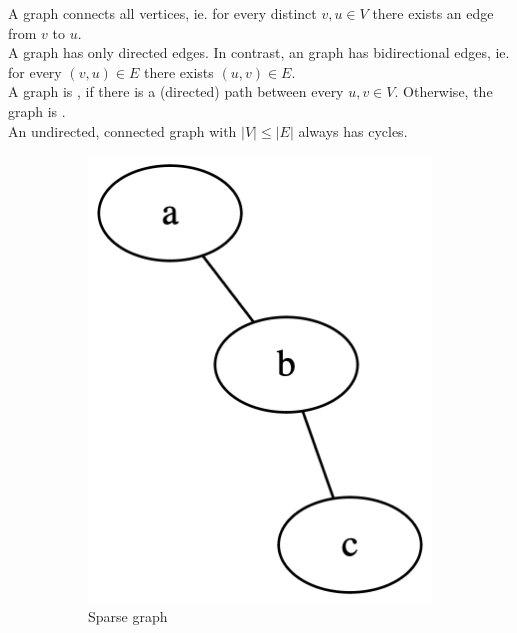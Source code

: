 \documentclass[a3paper, landscape, 11pt]{article} %
\begin{document}
\begin{multicols*}{4}
{A  graph connects all vertices, ie. for every distinct $v,u \in V$ there exists an edge from $v$ to $u$.\\

A  graph has only directed edges. In contrast, an  graph has bidirectional edges, ie. for every $(v,u)\in E$ there exists $(u,v)\in E$.\\

A graph is , if there is a \nolinebreak(directed) path between every $u,v \in V$. Otherwise, the graph is .\\

An undirected, connected graph with $|V| \le |E|$ always has cycles.\\

\begin{figure}[H]
  \centering
  \begin{subfigure}[b]{0.3\columnwidth}
    \centering
    \includegraphics[width=0.7\columnwidth]{images/sparse.png}
    \caption{Sparse graph}
    \label{fig:image1}
  \end{subfigure}
  \hfill
  \begin{subfigure}[b]{0.3\columnwidth}
    \centering

\end{subfigure}
\end{figure}}
\end{multicols*}
\end{document}
